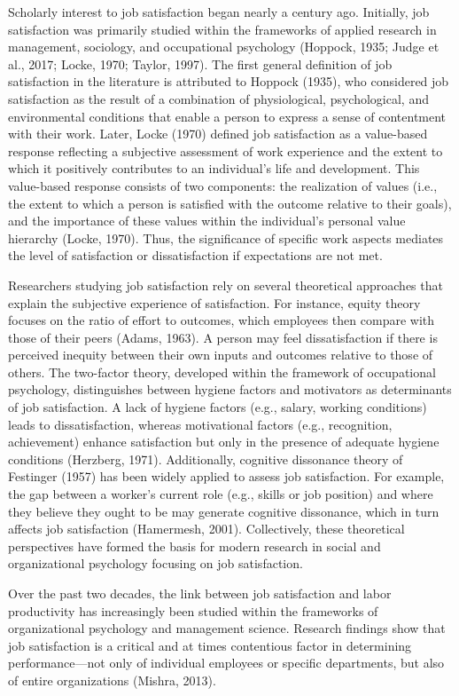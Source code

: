 \documentclass[
]{interact}
\begin{document}
Scholarly interest to job satisfaction began nearly a century ago.
Initially, job satisfaction was primarily studied within the frameworks
of applied research in management, sociology, and occupational
psychology (Hoppock, 1935; Judge et al., 2017; Locke, 1970; Taylor,
1997). The first general definition of job satisfaction in the
literature is attributed to Hoppock (1935), who considered job
satisfaction as the result of a combination of physiological,
psychological, and environmental conditions that enable a person to
express a sense of contentment with their work. Later, Locke (1970)
defined job satisfaction as a value-based response reflecting a
subjective assessment of work experience and the extent to which it
positively contributes to an individual's life and development. This
value-based response consists of two components: the realization of
values (i.e., the extent to which a person is satisfied with the outcome
relative to their goals), and the importance of these values within the
individual's personal value hierarchy (Locke, 1970). Thus, the
significance of specific work aspects mediates the level of satisfaction
or dissatisfaction if expectations are not met.

Researchers studying job satisfaction rely on several theoretical
approaches that explain the subjective experience of satisfaction. For
instance, equity theory focuses on the ratio of effort to outcomes,
which employees then compare with those of their peers (Adams, 1963). A
person may feel dissatisfaction if there is perceived inequity between
their own inputs and outcomes relative to those of others. The
two-factor theory, developed within the framework of occupational
psychology, distinguishes between hygiene factors and motivators as
determinants of job satisfaction. A lack of hygiene factors (e.g.,
salary, working conditions) leads to dissatisfaction, whereas
motivational factors (e.g., recognition, achievement) enhance
satisfaction but only in the presence of adequate hygiene conditions
(Herzberg, 1971). Additionally, cognitive dissonance theory of Festinger
(1957) has been widely applied to assess job satisfaction. For example,
the gap between a worker's current role (e.g., skills or job position)
and where they believe they ought to be may generate cognitive
dissonance, which in turn affects job satisfaction (Hamermesh, 2001).
Collectively, these theoretical perspectives have formed the basis for
modern research in social and organizational psychology focusing on job
satisfaction.

Over the past two decades, the link between job satisfaction and labor
productivity has increasingly been studied within the frameworks of
organizational psychology and management science. Research findings show
that job satisfaction is a critical and at times contentious factor in
determining performance---not only of individual employees or specific
departments, but also of entire organizations (Mishra, 2013).
\end{document}

